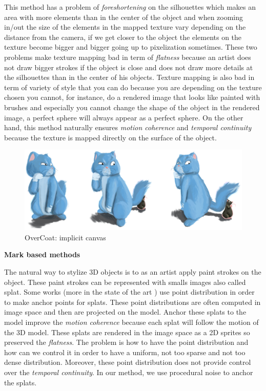 This method has a problem of \textit{foreshortening} on the silhouettes which makes an area with more elements than in the center of the object and when zooming in/out the size of the elements in the mapped texture vary depending on the distance from the camera, if we get closer to the object the elements on the texture become bigger and bigger going up to pixelization sometimes. These two problems make texture mapping bad in term of \textit{flatness} because an artist does not draw bigger strokes if the object is close and does not draw more details at the silhouettes than in the center of his objects. Texture mapping is also bad in term of variety of style that you can do because you are depending on the texture chosen you cannot, for instance, do a rendered image that looks like painted with brushes and especially you cannot change the shape of the object in the rendered image, a perfect sphere will always appear as a perfect sphere. On the other hand, this method naturally ensures \textit{motion coherence} and \textit{temporal continuity} because the texture is mapped directly on the surface of the object. \newline




\begin{figure}
    \begin{center}

    \includegraphics[scale=0.5]{images/overcoat.jpg}
    \end{center}
    \caption{OverCoat: implicit canvas \cite{schmid_overcoat:_2011}}
    \label{overcoat_figure}
\end{figure}

\textbf{Mark based methods}

The natural way to stylize 3D objects is to as an artist apply paint strokes on the object. These paint strokes can be represented with smalls images also called splat. Some works \cite{meier_painterly_1996, Fekete_2000, chi_stylized_2006}(more in the state of the art \cite{benard_state---art_2011}) use point distribution in order to make anchor points for splats. These point distributions are often computed in image space and then are projected on the model. Anchor these splats to the model improve the \textit{motion coherence} because each splat will follow the motion of the 3D model. These splats are rendered in the image space as a 2D sprites so preserved the \textit{flatness}. The problem is how to have the point distribution and how can we control it in order to have a uniform, not too sparse and not too dense distribution. Moreover, these point distribution does not provide control over the \textit{temporal continuity}. In our method, we use procedural noise to anchor the splats.


